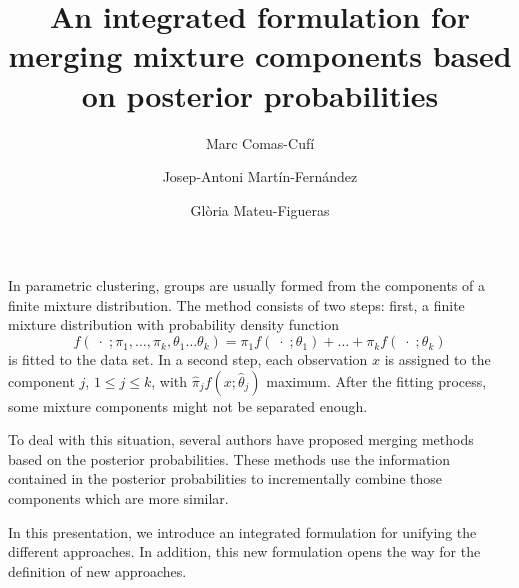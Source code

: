 \documentclass[a4paper,11pt]{article}
\title{An integrated formulation for merging mixture components based on posterior probabilities}
\author{Marc Comas-Cufí \and Josep-Antoni Martín-Fernández \and Glòria Mateu-Figueras}
\begin{document}
\maketitle

In parametric clustering, groups are usually formed from the components of a finite mixture distribution. The method consists of two steps: first, a finite mixture distribution with probability density function
\[
f(\;\cdot\; ; \pi_1, \dots, \pi_k, \theta_1 \dots \theta_k) = \pi_1  f (\;\cdot\; ; \theta_1) + \dots + \pi_k f(\;\cdot\; ; \theta_k)
\]
is fitted to the data set.  In a second step, each observation $x$ is assigned to the component $j$, $1\leq j \leq k$, with $\hat{\pi}_j f( x ; \hat{\theta}_j)$ maximum. After the fitting process, some mixture components might not be separated enough. 

To deal with this situation, several authors have proposed merging methods based on the posterior probabilities. These methods use  the information contained in the posterior probabilities to incrementally combine those components which are more similar. 

In this presentation, we introduce an integrated formulation for unifying the different approaches. In addition, this new formulation opens the way for the definition of new approaches.
\end{document}
